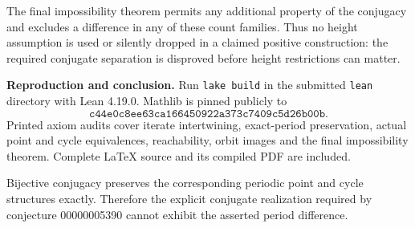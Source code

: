\documentclass[11pt]{article}
\begin{document}
The final impossibility theorem permits any additional property of the conjugacy and excludes a difference in any of these count families. Thus no height assumption is used or silently dropped in a claimed positive construction: the required conjugate separation is disproved before height restrictions can matter.

\medskip
\noindent\textbf{Reproduction and conclusion.}
Run \texttt{lake build} in the submitted \texttt{lean} directory with Lean 4.19.0. Mathlib is pinned publicly to
\[
 \texttt{c44e0c8ee63ca166450922a373c7409c5d26b00b}.
\]
Printed axiom audits cover iterate intertwining, exact-period preservation, actual point and cycle equivalences, reachability, orbit images and the final impossibility theorem. Complete LaTeX source and its compiled PDF are included.

Bijective conjugacy preserves the corresponding periodic point and cycle structures exactly. Therefore the explicit conjugate realization required by conjecture 00000005390 cannot exhibit the asserted period difference.
\end{document}
